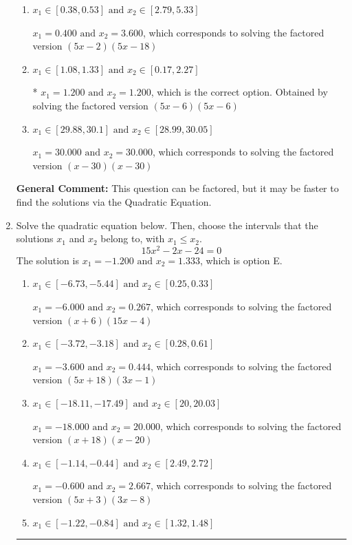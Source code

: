 \documentclass{extbook}[14pt]
\newcommand{\litem}[1]{\item #1

\rule{\textwidth}{0.4pt}}
\begin{document}
\begin{enumerate}
{\begin{enumerate}[label=\Alph*.]
$x_1 = 0.600 \text{ and } x_2 = 2.400$, which corresponds to solving the factored version $(5x -3)(5x -12)$
\item \( x_1 \in [0.38, 0.53] \text{ and } x_2 \in [2.79, 5.33] \)

$x_1 = 0.400 \text{ and } x_2 = 3.600$, which corresponds to solving the factored version $(5x -2)(5x -18)$
\item \( x_1 \in [1.08, 1.33] \text{ and } x_2 \in [0.17, 2.27] \)

* $x_1 = 1.200 \text{ and } x_2 = 1.200$, which is the correct option. Obtained by solving the factored version $(5x -6)(5x -6)$
\item \( x_1 \in [29.88, 30.1] \text{ and } x_2 \in [28.99, 30.05] \)

$x_1 = 30.000 \text{ and } x_2 = 30.000$, which corresponds to solving the factored version $(x -30)(x -30)$
\end{enumerate}

\textbf{General Comment:} This question can be factored, but it may be faster to find the solutions via the Quadratic Equation.
}
\litem{
Solve the quadratic equation below. Then, choose the intervals that the solutions $x_1$ and $x_2$ belong to, with $x_1 \leq x_2$.
\[ 15x^{2} -2 x -24 = 0 \]The solution is \( x_1 = -1.200 \text{ and } x_2 = 1.333 \), which is option E.\begin{enumerate}[label=\Alph*.]
\item \( x_1 \in [-6.73, -5.44] \text{ and } x_2 \in [0.25, 0.33] \)

$x_1 = -6.000 \text{ and } x_2 = 0.267$, which corresponds to solving the factored version $(x + 6)(15x -4)$
\item \( x_1 \in [-3.72, -3.18] \text{ and } x_2 \in [0.28, 0.61] \)

$x_1 = -3.600 \text{ and } x_2 = 0.444$, which corresponds to solving the factored version $(5x + 18)(3x -1)$
\item \( x_1 \in [-18.11, -17.49] \text{ and } x_2 \in [20, 20.03] \)

$x_1 = -18.000 \text{ and } x_2 = 20.000$, which corresponds to solving the factored version $(x + 18)(x -20)$
\item \( x_1 \in [-1.14, -0.44] \text{ and } x_2 \in [2.49, 2.72] \)

$x_1 = -0.600 \text{ and } x_2 = 2.667$, which corresponds to solving the factored version $(5x + 3)(3x -8)$
\item \( x_1 \in [-1.22, -0.84] \text{ and } x_2 \in [1.32, 1.48] \)


\end{enumerate}}
\end{enumerate}
\end{document}
